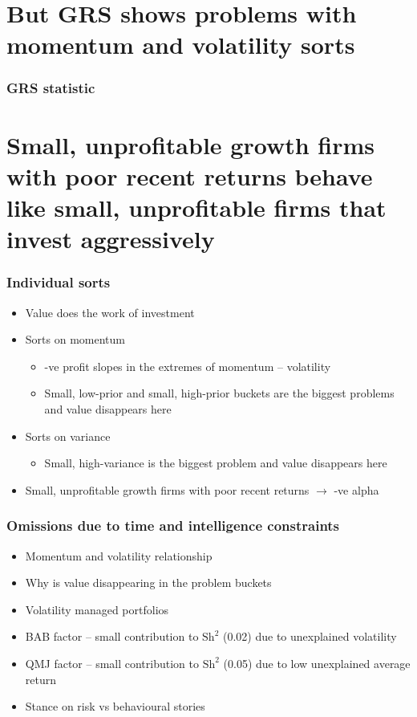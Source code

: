 \documentclass{beamer}
\begin{document}
\section{But GRS shows problems with momentum and volatility sorts}
\begin{frame}
\frametitle{GRS statistic}
\begin{center}
\resizebox*{!}{\dimexpr\textheight-1.3cm\relax}{
    
    }
\end{center}
\end{frame}

\section{Small, unprofitable growth firms with poor recent returns
behave like small, unprofitable firms that invest aggressively}
\begin{frame}
\frametitle{Individual sorts}
\begin{itemize}
    \item Value does the work of investment
    \item Sorts on momentum
    \begin{itemize}
        \item -ve profit slopes in the extremes of momentum -- volatility
        \item Small, low-prior and small, high-prior buckets are the biggest
        problems and value disappears here
    \end{itemize}
    \item Sorts on variance
    \begin{itemize}
        \item Small, high-variance is the biggest problem and value disappears
        here
    \end{itemize}
    \item Small, unprofitable growth firms with poor recent returns
    $\rightarrow$ -ve alpha
\end{itemize}
\end{frame}

\begin{frame}
\frametitle{Omissions due to time and intelligence constraints}
\begin{itemize}
    \item Momentum and volatility relationship
    \item Why is value disappearing in the problem buckets
    \item Volatility managed portfolios
    \item BAB factor -- small contribution to $\text{Sh}^2$ (0.02) due to
    unexplained volatility
    \item QMJ factor -- small contribution to $\text{Sh}^2$ (0.05) due to low
    unexplained average return
    \item Stance on risk vs behavioural stories
\end{itemize}
\end{frame}
\end{document}
